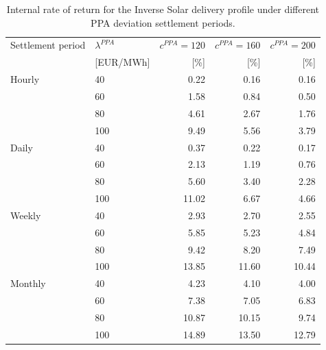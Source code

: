 \begin{table}[H]
\centering
\small
\caption{Internal rate of return for the Inverse Solar delivery profile under different PPA deviation settlement periods.}
\label{tab:irr_inverse_solar}
\begin{tabular}{llrrr}
\toprule
Settlement period & $\lambda^{PPA}$ & $c^{PPA}=120$ & $c^{PPA}=160$ & $c^{PPA}=200$ \\
 & [EUR/MWh] & [\%] & [\%] & [\%] \\
\midrule
Hourly & 40 & 0.22 & 0.16 & 0.16 \\
 & 60 & 1.58 & 0.84 & 0.50 \\
 & 80 & 4.61 & 2.67 & 1.76 \\
 & 100 & 9.49 & 5.56 & 3.79 \\
\addlinespace
Daily & 40 & 0.37 & 0.22 & 0.17 \\
 & 60 & 2.13 & 1.19 & 0.76 \\
 & 80 & 5.60 & 3.40 & 2.28 \\
 & 100 & 11.02 & 6.67 & 4.66 \\
\addlinespace
Weekly & 40 & 2.93 & 2.70 & 2.55 \\
 & 60 & 5.85 & 5.23 & 4.84 \\
 & 80 & 9.42 & 8.20 & 7.49 \\
 & 100 & 13.85 & 11.60 & 10.44 \\
\addlinespace
Monthly & 40 & 4.23 & 4.10 & 4.00 \\
 & 60 & 7.38 & 7.05 & 6.83 \\
 & 80 & 10.87 & 10.15 & 9.74 \\
 & 100 & 14.89 & 13.50 & 12.79 \\
\bottomrule
\end{tabular}
\end{table}

